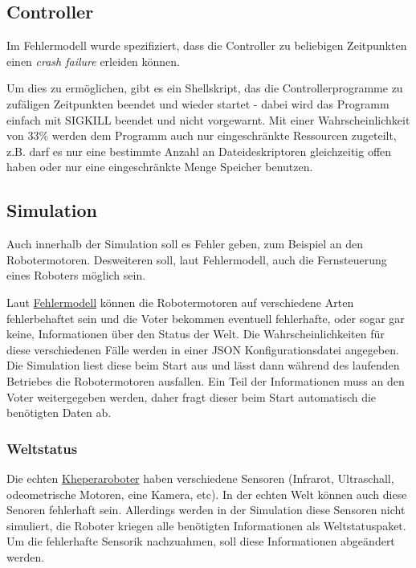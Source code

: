 \subsection{Controller}
Im Fehlermodell wurde spezifiziert, dass die Controller zu beliebigen Zeitpunkten einen
\textit{crash failure} erleiden k{\"{o}}nnen.

Um dies zu erm{\"{o}}glichen, gibt es ein Shellskript, das die Controllerprogramme zu zuf{\"{a}}ligen Zeitpunkten 
beendet und wieder startet - dabei wird das Programm einfach mit SIGKILL beendet und nicht vorgewarnt.
Mit einer Wahrscheinlichkeit von 33\% werden dem Programm auch nur eingeschr{\"{a}}nkte Ressourcen zugeteilt,
z.B. darf es nur eine bestimmte Anzahl an Dateideskriptoren gleichzeitig offen haben oder nur eine 
eingeschr{\"{a}}nkte Menge Speicher benutzen.


\subsection{Simulation}
Auch innerhalb der Simulation soll es Fehler geben, zum Beispiel an den Robotermotoren. Desweiteren soll,
laut Fehlermodell, auch die Fernsteuerung eines Roboters m{\"{o}}glich sein.

Laut \hyperref[fm]{Fehlermodell} k{\"{o}}nnen die Robotermotoren auf verschiedene Arten fehlerbehaftet
sein und die Voter bekommen eventuell fehlerhafte, oder sogar gar keine, Informationen {\"{u}}ber
den Status der Welt. Die Wahrscheinlichkeiten f{\"{u}}r diese verschiedenen F{\"{a}}lle
werden in einer JSON Konfigurationsdatei angegeben. Die Simulation liest diese beim Start aus und 
l{\"{a}}sst dann w{\"{a}}hrend des laufenden Betriebes die Robotermotoren ausfallen.
Ein Teil der Informationen muss an den Voter weitergegeben werden, daher fragt dieser beim Start
automatisch die ben{\"{o}}tigten Daten ab.


\subsubsection{Weltstatus}
Die echten \hyperref[khepera]{Kheperaroboter} haben verschiedene Sensoren (Infrarot, Ultraschall,
odeometrische Motoren, eine Kamera, etc). In der echten Welt k{\"{o}}nnen auch diese Senoren fehlerhaft
sein. Allerdings werden in der Simulation diese Sensoren nicht simuliert, die Roboter kriegen alle
ben{\"{o}}tigten Informationen als Weltstatuspaket. Um die fehlerhafte Sensorik nachzuahmen, soll diese
Informationen abge{\"{a}}ndert werden.

